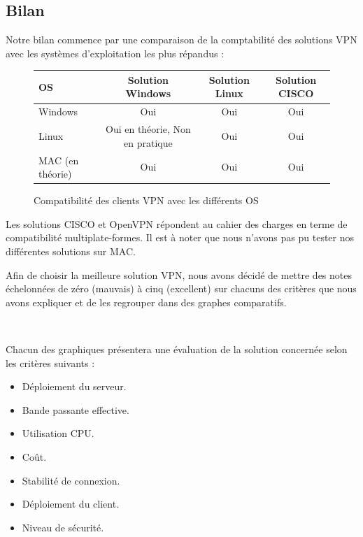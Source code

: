 \subsection{Bilan}

Notre bilan commence par une comparaison de la comptabilité des solutions VPN avec les systèmes d'exploitation les plus répandus :

\begin{figure}[H]
	\begin{center}
\begin{tabular}{l|c|c|c}
OS & Solution Windows & Solution Linux & Solution CISCO \\
\hline
Windows & Oui & Oui & Oui \\
Linux & Oui en théorie, Non en pratique & Oui & Oui \\
MAC (en théorie) & Oui & Oui & Oui \\
\end{tabular}
	\end{center}
	\caption{Compatibilité des clients VPN avec les différents OS}
	\label{Compatibilité_des_OS}
\end{figure}

Les solutions CISCO et OpenVPN répondent au cahier des charges en terme de compatibilité multiplate-formes. Il est à noter que nous n'avons pas pu tester nos différentes solutions sur MAC.

Afin de choisir la meilleure solution VPN, nous avons décidé de mettre des notes échelonnées de zéro (mauvais) à cinq (excellent) sur chacuns des critères que nous avons expliquer et de les regrouper dans des graphes comparatifs.

~

Chacun des graphiques présentera une évaluation de la solution concernée selon les critères suivants :
\begin{itemize}
 	\item Déploiement du serveur.
 	\item Bande passante effective.
 	\item Utilisation CPU.
 	\item Coût.
 	\item Stabilité de connexion.
 	\item Déploiement du client.
	\item Niveau de sécurité.
\end{itemize}


